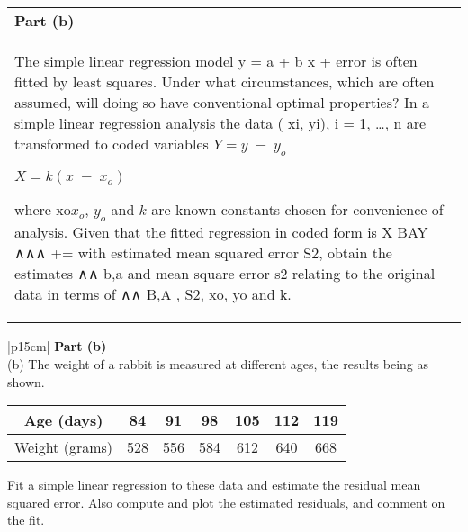 \documentclass[a4paper,12pt]{article}
\begin{document}
\begin{table}[ht!]
     \centering
     \begin{tabular}{|p{15cm}|}
     \hline        
 \noindent \textbf{Part (b)}\\
\noindent 
 The simple linear regression model y = a  + b x + error is often fitted by least squares.  Under what circumstances, which are often assumed, will doing so have conventional optimal properties?
In a simple linear regression analysis the data ( xi, yi), i = 1, …, n are transformed to coded variables $Y = y \; -\; y_o$

$X = k(x\; -\; x_o)$

where xo$x_o$, $y_o$ and $k$ are known constants chosen for convenience of analysis.
Given that the fitted regression in coded form is
 X BAY ∧∧∧ +=
with estimated mean squared error S2, obtain the estimates 
∧∧ b,a and mean square
error s2 relating to the original data in terms of 
∧∧ B,A , S2, xo, yo and k.
\\ \hline
 \end{tabular}
\end{table}
\begin{table}[ht!]
     \centering
     \begin{tabular}{|p{15cm}|}
     \hline        
 \noindent \textbf{Part (b)}\\
\noindent (b) The weight of a rabbit is measured at different ages, the results being as shown.


\begin{center}
\begin{tabular}{|c|c|c|c|c|c|c|} \hline
Age (days) & 84 & 91 & 98 & 105 & 112 & 119  \\ \hline
Weight (grams) & 528 & 556 & 584 & 612 & 640 & 668  \\ \hline

\end{tabular}
\end{center}


Fit a simple linear regression to these data and estimate the residual mean squared error.  Also compute and plot the estimated residuals, and comment on the fit.

\\ \hline
 \end{tabular}
\end{table}
\end{document}
